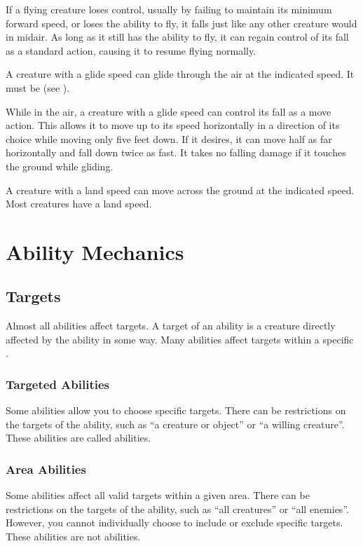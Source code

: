          If a flying creature loses control, usually by failing to maintain its minimum forward speed, or loses the ability to fly, it falls just like any other creature would in midair. As long as it still has the ability to fly, it can regain control of its fall as a standard action, causing it to resume flying normally.

        \label{Gliding}
        A creature with a glide speed can glide through the air at the indicated speed. It must be  (see ).

        While in the air, a creature with a glide speed can control its fall as a move action. This allows it to move up to its speed horizontally in a direction of its choice while moving only five feet down. If it desires, it can move half as far horizontally and fall down twice as fast. It takes no falling damage if it touches the ground while gliding.

        A creature with a land speed can move across the ground at the indicated speed.
        Most creatures have a land speed.

\section{Ability Mechanics}\label{Ability Mechanics}

    \subsection{Targets}\label{Targets}
        Almost all abilities affect targets.
        A target of an ability is a creature directly affected by the ability in some way.
        Many abilities affect targets within a specific .

        \subsubsection{Targeted Abilities}\label{Targeted Abilities}
            Some abilities allow you to choose specific targets.
            There can be restrictions on the targets of the ability, such as ``a creature or object'' or ``a willing creature''.
            These abilities are called  abilities.

        \subsubsection{Area Abilities}
            Some abilities affect all valid targets within a given area.
            There can be restrictions on the targets of the ability, such as ``all creatures'' or ``all enemies''.
            However, you cannot individually choose to include or exclude specific targets.
            These abilities are not  abilities.

